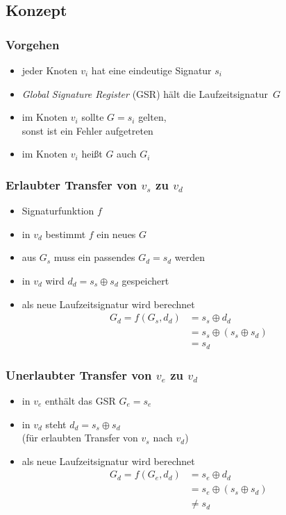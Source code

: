 \documentclass[mathserif,slidestop,compress,red]{beamer}
\begin{document}
\subsection{Konzept}

\begin{frame}
  \frametitle{Vorgehen}
  \begin{itemize}
    \item jeder Knoten $v_i$ hat eine eindeutige Signatur $s_i$
    \pause
    \item \emph{Global Signature Register} (GSR) hält die Laufzeitsignatur~$G$
    \pause
    \item im Knoten $v_i$ sollte $G = s_i$ gelten, \\
          sonst ist ein Fehler aufgetreten
    \pause
    \item im Knoten $v_i$ heißt $G$ auch $G_i$
  \end{itemize}
\end{frame}

\begin{frame}
  \frametitle{Erlaubter Transfer von $v_s$ zu $v_d$}
  \begin{itemize}
    \pause
    \item Signaturfunktion $f$
    \item in $v_d$ bestimmt $f$ ein neues $G$
    \pause
    \item aus $G_s$ muss ein passendes $G_d = s_d$ werden
    \pause
    \item in $v_d$ wird $d_d = s_s \oplus s_d$ gespeichert
    \pause
    \item als neue Laufzeitsignatur wird berechnet
    \begin{align*}
    G_d = f(G_s, d_d) &= s_s \oplus d_d \\
    &= s_s \oplus ( s_s \oplus s_d ) \\
    &= s_d
    \end{align*}
  \end{itemize}
\end{frame}

\begin{frame}
  \frametitle{Unerlaubter Transfer von $v_e$ zu $v_d$}
  \begin{itemize}
    \pause
    \item in $v_e$ enthält das GSR $G_e = s_e$
    \pause
    \item in $v_d$ steht $d_d = s_s \oplus s_d$ \\
          (für erlaubten Transfer von $v_s$ nach $v_d$)
    \pause
    \item als neue Laufzeitsignatur wird berechnet
    \begin{align*}
    G_d = f(G_e, d_d) &= s_e \oplus d_d \\
    &= s_e \oplus ( s_s \oplus s_d ) \\
    &\neq s_d
    \end{align*}
  \end{itemize}
\end{frame}
\end{document}
